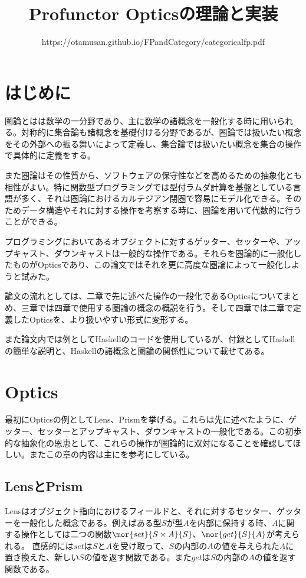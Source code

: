 \documentclass[uplatex,dvipdfmx]{jsarticle}
\begin{document}
  \title{Profunctor Opticsの理論と実装}
  \author{https://otamusan.github.io/FPandCategory/categoricalfp.pdf}
  \maketitle

	\tableofcontents
  \pagebreak
  \section{はじめに}
  圏論とはは数学の一分野であり、主に数学の諸概念を一般化する時に用いられる。対称的に集合論も諸概念を基礎付ける分野であるが、圏論では扱いたい概念をその外部への振る舞いによって定義し、集合論では扱いたい概念を集合の操作で具体的に定義をする。

  また圏論はその性質から、ソフトウェアの保守性などを高めるための抽象化とも相性がよい。特に関数型プログラミングでは型付ラムダ計算を基盤としている言語が多く、それは圏論におけるカルテジアン閉圏で容易にモデル化できる。そのためデータ構造やそれに対する操作を考察する時に、圏論を用いて代数的に行うことができる。

  プログラミングにおいてあるオブジェクトに対するゲッター、セッターや、アップキャスト、ダウンキャストは一般的な操作である。それらを圏論的に一般化したものがOpticsであり、この論文ではそれを更に高度な圏論によって一般化しようと試みた。

  論文の流れとしては、二章で先に述べた操作の一般化であるOpticsについてまとめ、三章では四章で使用する圏論の概念の概説を行う。そして四章では二章で定義したOpticsを、より扱いやすい形式に変形する。

  また論文内では例としてHaskellのコードを使用しているが、付録としてHaskellの簡単な説明と、Haskellの諸概念と圏論の関係性について載せてある。
  \section{Optics}
  最初にOpticsの例としてLens、Prismを挙げる。これらは先に述べたように、ゲッター、セッターとアップキャスト、ダウンキャストの一般化である。この初歩的な抽象化の恩恵として、これらの操作が圏論的に双対になることを確認してほしい。またこの章の内容は主に\cite{categories_of_optics}を参考にしている。

  \subsection{LensとPrism}
  Lensはオブジェクト指向におけるフィールドと、それに対するセッター、ゲッターを一般化した概念である。例えばある型$S$が型$A$を内部に保持する時、$A$に関する操作としては二つの関数$\mor{set}{S\times A}{S}$、$\mor{get}{S}{A}$が考えられる。
  直感的には$set$は$S$と$A$を受け取って、$S$の内部の$A$の値を与えられた$A$に置き換えた、新しい$S$の値を返す関数である。また$get$は$S$の内部の$A$の値を返す関数である。
  
\end{document}
